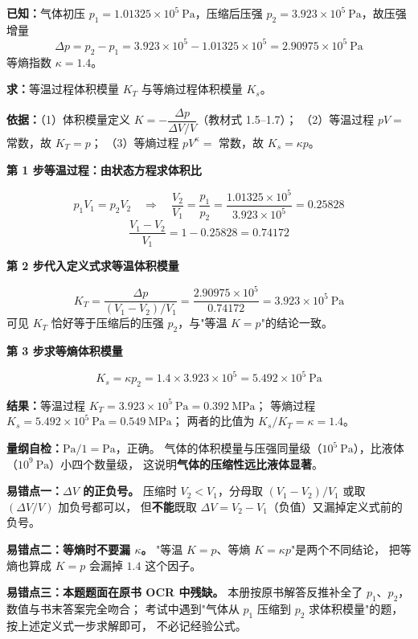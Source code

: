 \begin{jie}
\textbf{已知：}气体初压 $p_1=1.01325\times10^{5}\ \mathrm{Pa}$，压缩后压强
$p_2=3.923\times10^{5}\ \mathrm{Pa}$，故压强增量
\[ \Delta p=p_2-p_1=3.923\times10^{5}-1.01325\times10^{5}=2.90975\times10^{5}\ \mathrm{Pa} \]
等熵指数 $\kappa=1.4$。

\textbf{求：}等温过程体积模量 $K_T$ 与等熵过程体积模量 $K_s$。

\textbf{依据：}（1）体积模量定义 $K=-\dfrac{\Delta p}{\Delta V/V}$（教材式 1.5--1.7）；
（2）等温过程 $pV=$ 常数，故 $K_T=p$；
（3）等熵过程 $pV^{\kappa}=$ 常数，故 $K_s=\kappa p$。

\textbf{第 1 步\quad 等温过程：由状态方程求体积比}

\[ p_1V_1=p_2V_2\quad\Longrightarrow\quad
   \frac{V_2}{V_1}=\frac{p_1}{p_2}=\frac{1.01325\times10^{5}}{3.923\times10^{5}}=0.25828 \]
\[ \frac{V_1-V_2}{V_1}=1-0.25828=0.74172 \]

\textbf{第 2 步\quad 代入定义式求等温体积模量}

\[ K_T=\frac{\Delta p}{(V_1-V_2)/V_1}
       =\frac{2.90975\times10^{5}}{0.74172}
       =3.923\times10^{5}\ \mathrm{Pa} \]
可见 $K_T$ 恰好等于压缩后的压强 $p_2$，与"等温 $K=p$"的结论一致。

\textbf{第 3 步\quad 求等熵体积模量}

\[ K_s=\kappa p_2=1.4\times3.923\times10^{5}=5.492\times10^{5}\ \mathrm{Pa} \]

\textbf{结果：}等温过程 $K_T=3.923\times10^{5}\ \mathrm{Pa}=0.392\ \mathrm{MPa}$；
等熵过程 $K_s=5.492\times10^{5}\ \mathrm{Pa}=0.549\ \mathrm{MPa}$；
两者的比值为 $K_s/K_T=\kappa=1.4$。

\textbf{量纲自检：}$\mathrm{Pa}/1=\mathrm{Pa}$，正确。
气体的体积模量与压强同量级（$10^{5}\ \mathrm{Pa}$），比液体（$10^{9}\ \mathrm{Pa}$）小四个数量级，
这说明\textbf{气体的压缩性远比液体显著}。
\end{jie}

\begin{yicuo}
\textbf{易错点一：$\Delta V$ 的正负号。}
压缩时 $V_2<V_1$，分母取 $(V_1-V_2)/V_1$ 或取 $(\Delta V/V)$ 加负号都可以，
但\textbf{不能}既取 $\Delta V=V_2-V_1$（负值）又漏掉定义式前的负号。

\textbf{易错点二：等熵时不要漏 $\kappa$。}
"等温 $K=p$、等熵 $K=\kappa p$"是两个不同结论，
把等熵也算成 $K=p$ 会漏掉 $1.4$ 这个因子。

\textbf{易错点三：本题题面在原书 OCR 中残缺。}
本册按原书解答反推补全了 $p_1$、$p_2$，数值与书末答案完全吻合；
考试中遇到"气体从 $p_1$ 压缩到 $p_2$ 求体积模量"的题，按上述定义式一步求解即可，
不必记经验公式。
\end{yicuo}

